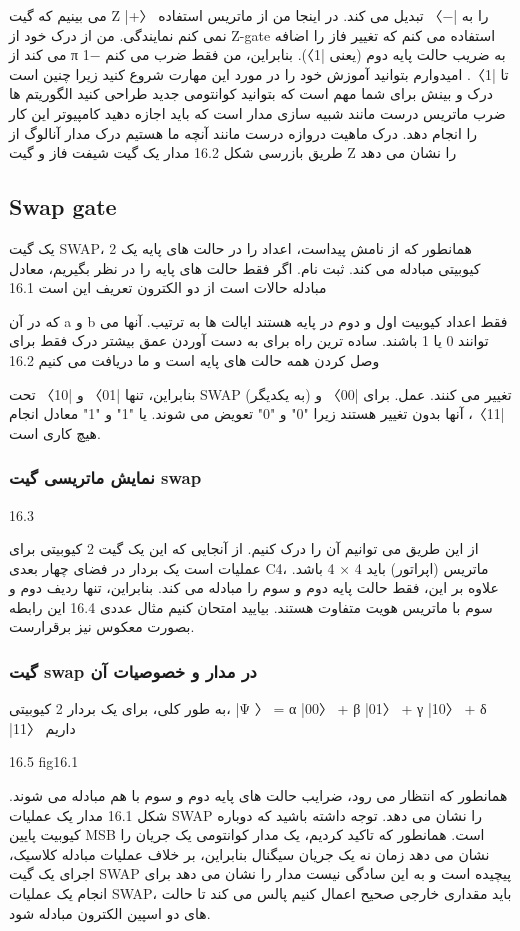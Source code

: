 \documentclass{book}
\begin{document}
می بینیم که گیت Z |+〉 را به |−〉 تبدیل می کند. در اینجا من از ماتریس استفاده نمی کنم
نمایندگی. من از درک خود از Z-gate استفاده می کنم که تغییر فاز را اضافه می کند
از π به ضریب حالت پایه دوم (یعنی |1〉). بنابراین، من فقط ضرب می کنم
−1 تا |1〉. امیدوارم بتوانید آموزش خود را در مورد این مهارت شروع کنید زیرا چنین است
درک و بینش برای شما مهم است که بتوانید کوانتومی جدید طراحی کنید
الگوریتم ها ضرب ماتریس درست مانند شبیه سازی مدار است که باید
اجازه دهید کامپیوتر این کار را انجام دهد. درک ماهیت دروازه درست مانند آنچه ما هستیم
درک مدار آنالوگ از طریق بازرسی
شکل 16.2 مدار یک گیت شیفت فاز و گیت Z را نشان می دهد
\subsection{Swap gate}
یک گیت SWAP، همانطور که از نامش پیداست، اعداد را در حالت های پایه یک 2 کیوبیتی مبادله می کند.
ثبت نام. اگر فقط حالت های پایه را در نظر بگیریم، معادل مبادله حالات است
از دو الکترون تعریف این است
16.1

که در آن a و b فقط اعداد کیوبیت اول و دوم در پایه هستند
ایالت ها به ترتیب. آنها می توانند 0 یا 1 باشند. ساده ترین راه برای به دست آوردن عمق بیشتر
درک فقط برای وصل کردن همه حالت های پایه است و ما دریافت می کنیم
16.2


بنابراین، تنها |01〉 و |10〉 تحت SWAP (به یکدیگر) تغییر می کنند.
عمل. برای |00〉 و |11〉، آنها بدون تغییر هستند زیرا "0" و "0" تعویض می شوند.
یا "1" و "1" معادل انجام هیچ کاری است.


\subsubsection{نمایش ماتریسی گیت swap}
16.3

از این طریق می توانیم آن را درک کنیم. از آنجایی که این یک گیت 2 کیوبیتی برای عملیات است
یک بردار در فضای چهار بعدی C4، ماتریس (اپراتور) باید 4 × 4 باشد.
علاوه بر این، فقط حالت پایه دوم و سوم را مبادله می کند. بنابراین، تنها
ردیف دوم و سوم با ماتریس هویت متفاوت هستند. بیایید امتحان کنیم
مثال عددی
16.4
این رابطه‌ بصورت معکوس نیز برقرارست.
\subsubsection{گیت swap در مدار و خصوصیات آن}
به طور کلی، برای یک بردار 2 کیوبیتی، |Ψ 〉 = α |00〉 + β |01〉 + γ |10〉 + δ |11〉 داریم

16.5
fig16.1

همانطور که انتظار می رود، ضرایب حالت های پایه دوم و سوم با هم مبادله می شوند.
شکل 16.1 مدار یک عملیات SWAP را نشان می دهد. توجه داشته باشید که دوباره کیوبیت پایین
MSB است. همانطور که تاکید کردیم، یک مدار کوانتومی یک جریان را نشان می دهد
زمان نه یک جریان سیگنال بنابراین، بر خلاف عملیات مبادله کلاسیک،
اجرای یک گیت SWAP پیچیده است و به این سادگی نیست
مدار را نشان می دهد برای انجام یک عملیات SWAP، باید مقداری خارجی صحیح اعمال کنیم
پالس می کند تا حالت های دو اسپین الکترون مبادله شود.
\end{document}
